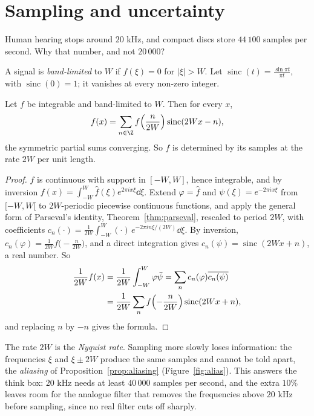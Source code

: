 \section{Sampling and uncertainty}

\begin{think}
Human hearing stops around $20$ kHz, and compact discs store $44\,100$ samples per second. Why that number, and not
$20\,000$?
\end{think}

A signal is \emph{band-limited} to $W$ if $\hat f(\xi)=0$ for $|\xi|>W$. Let $\operatorname{sinc}(t)=\frac{\sin\pi t}{\pi t}$, with $\operatorname{sinc}(0)=1$; it vanishes at every
non-zero integer.

\begin{theorem}\label{thm:shannon}
Let $f$ be integrable and band-limited to $W$. Then for every $x$,
\[
f(x)=\sum_{n\in\Z}f\Bigl(\frac n{2W}\Bigr)\operatorname{sinc}(2Wx-n),
\]
the symmetric partial sums converging. So $f$ is determined by its samples at the rate $2W$ per unit length.
\end{theorem}
\begin{proof}
$\hat f$ is continuous with support in $[-W,W]$, hence integrable, and by inversion $f(x)=\int_{-W}^W\hat f(\xi)e^{2\pi ix\xi}\dd\xi$. Extend $\varphi=\hat f$ and
$\psi(\xi)=e^{-2\pi ix\xi}$ from $[-W,W[$ to $2W$-periodic piecewise continuous functions, and apply the general form of Parseval's identity,
Theorem~\ref{thm:parseval}, rescaled to period $2W$, with coefficients $c_n(\cdot)=\frac1{2W}\int_{-W}^W(\cdot)\,e^{-2\pi in\xi/(2W)}\dd\xi$. By inversion,
$c_n(\varphi)=\frac1{2W}f\bigl(-\frac n{2W}\bigr)$, and a direct integration gives $c_n(\psi)=\operatorname{sinc}(2Wx+n)$, a real number. So
\[
\begin{aligned}\frac1{2W}f(x)&=\frac1{2W}\int_{-W}^W\varphi\bar\psi=\sum_nc_n(\varphi)\overline{c_n(\psi)}\\&=\frac1{2W}\sum_nf\Bigl(-\frac n{2W}\Bigr)\operatorname{sinc}(2Wx+n),\end{aligned}
\]
and replacing $n$ by $-n$ gives the formula.
\end{proof}

The rate $2W$ is the \emph{Nyquist rate}. Sampling more slowly loses information: the frequencies $\xi$ and $\xi\pm2W$ produce the
same samples and cannot be told apart, the \emph{aliasing} of Proposition~\ref{prop:aliasing} (Figure~\ref{fig:alias}). This answers the think
box: $20$ kHz needs at least $40\,000$ samples per second, and the extra $10\%$ leaves room for the analogue filter that removes
the frequencies above $20$ kHz before sampling, since no real filter cuts off sharply.

